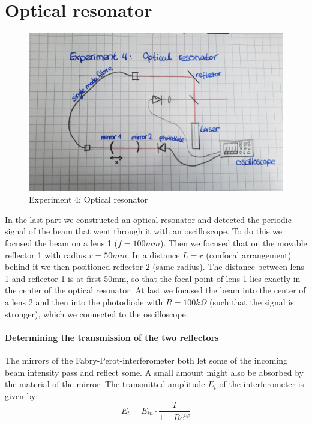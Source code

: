 \documentclass{article}
\begin{document}
\section{Optical resonator}

\begin{figure}[h!]
\includegraphics[width=\textwidth]{Tv4Aufbau.jpg}
\caption{Experiment 4: Optical resonator}
\label{TV4Aufbau}
\end{figure}

In the last part we constructed an optical resonator and detected the periodic signal of the beam that went through it with an oscilloscope. To do this we focused the beam on a lens 1 ($f=100mm$). Then we focused that on the movable reflector 1 with radius $r = 50mm$. In a distance $L=r$ (confocal arrangement) behind it we then positioned reflector 2 (same radius). The distance between lens 1 and reflector 1 is at first 50mm, so that the focal point of lens 1 lies exactly in the center of the optical resonator. At last we focused the beam into the center of a lens 2 and then into the photodiode with $R=100k\Omega$ (such that the signal is stronger), which we connected to the oscilloscope.

\paragraph{Determining the transmission of the two reflectors}
The mirrors of the Fabry-Perot-interferometer both let some of the incoming beam intensity pass and reflect some. A small amount might also be absorbed by the material of the mirror. The transmitted amplitude $E_{t}$ of the interferometer is given by:
\begin{equation}
E_{t} = E_{in}\cdot \frac{T}{1-Re^{i\varphi}}
\end{equation}
\end{document}
